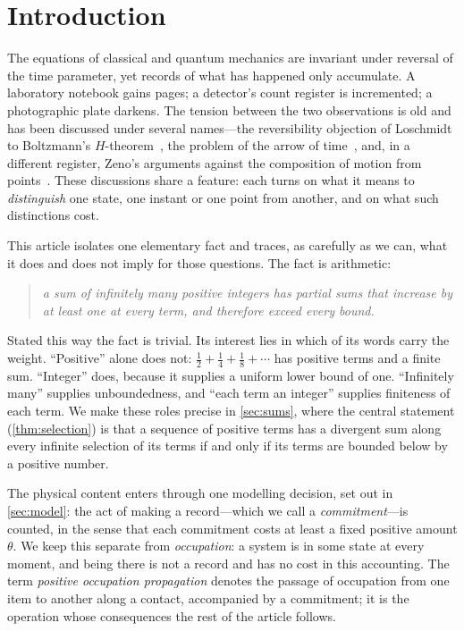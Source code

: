 \documentclass[10pt,twocolumn,a4paper]{article}
\begin{document}
\section{Introduction}
\label{sec:intro}

The equations of classical and quantum mechanics are invariant under reversal
of the time parameter, yet records of what has happened only accumulate. A
laboratory notebook gains pages; a detector's count register is incremented;
a photographic plate darkens. The tension between the two observations is old
and has been discussed under several names---the reversibility objection of
Loschmidt to Boltzmann's $H$-theorem~\citep{loschmidt1876,boltzmann1877},
the problem of the arrow of time~\citep{lebowitz1993,price1996,albert2000},
and, in a different register, Zeno's arguments against the composition of
motion from points~\citep{grunbaum1967,salmon2001}. These discussions share a
feature: each turns on what it means to \emph{distinguish} one state, one
instant or one point from another, and on what such distinctions cost.

This article isolates one elementary fact and traces, as carefully as we can,
what it does and does not imply for those questions. The fact is arithmetic:
\begin{quote}
\emph{a sum of infinitely many positive integers has partial sums that
increase by at least one at every term, and therefore exceed every bound.}
\end{quote}
Stated this way the fact is trivial. Its interest lies in which of its words
carry the weight. ``Positive'' alone does not: $\tfrac12+\tfrac14+\tfrac18+\cdots$
has positive terms and a finite sum. ``Integer'' does, because it supplies a
uniform lower bound of one. ``Infinitely many'' supplies unboundedness, and
``each term an integer'' supplies finiteness of each term. We make these
roles precise in \cref{sec:sums}, where the central statement
(\cref{thm:selection}) is that a sequence of positive terms has a divergent
sum along every infinite selection of its terms if and only if its terms are
bounded below by a positive number.

The physical content enters through one modelling decision, set out in
\cref{sec:model}: the act of making a record---which we call a
\emph{commitment}---is counted, in the sense that each commitment costs at
least a fixed positive amount $\theta$. We keep this separate from
\emph{occupation}: a system is in some state at every moment, and being there
is not a record and has no cost in this accounting. The term \emph{positive
occupation propagation} denotes the passage of occupation from one item to
another along a contact, accompanied by a commitment; it is the operation
whose consequences the rest of the article follows.
\end{document}
